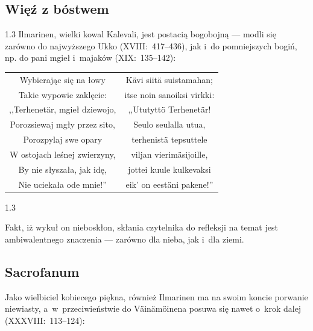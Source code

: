 \documentclass[11pt,a4paper,twoside]{report}
\begin{document}
\subsection*{Więź z bóstwem}
\begin{spacing}{1.3}
Ilmarinen, wielki kowal Kalevali, jest postacią bogobojną --- modli się zarówno do najwyższego Ukko (XVIII:~417--436), jak i~do pomniejszych bogiń, np. do pani mgieł i~majaków (XIX:~135--142):
\end{spacing}
{\centering
\small
\begin{longtable}{c c}
Wybierając się na łowy & Kävi siitä suistamahan; \\
Takie wypowie zaklęcie: & itse noin sanoiksi virkki: \\
,,Terhenetär, mgieł dziewojo, & ,,Ututyttö Terhenetär! \\
Porozsiewaj mgły przez sito, & Seulo seulalla utua, \\
Porozpylaj swe opary & terhenistä tepsuttele \\
W ostojach leśnej zwierzyny, & viljan vierimäsijoille, \\
By nie słyszała, jak idę, & jottei kuule kulkevaksi \\
Nie uciekała ode mnie!'' & eik' on eestäni pakene!'' \\
\end{longtable}
}
\begin{spacing}{1.3}

Fakt, iż wykuł on nieboskłon, skłania czytelnika do refleksji na temat jest ambiwalentnego znaczenia --- zarówno dla nieba, jak i~dla ziemi.

\vspace*{0.5\baselineskip}
\subsection*{Sacrofanum}

Jako wielbiciel kobiecego piękna, również Ilmarinen ma na swoim koncie porwanie niewiasty, a~w~przeciwieństwie do Väinämöinena posuwa się nawet o~krok dalej (XXXVIII:~113--124):

\end{spacing}
\end{document}
